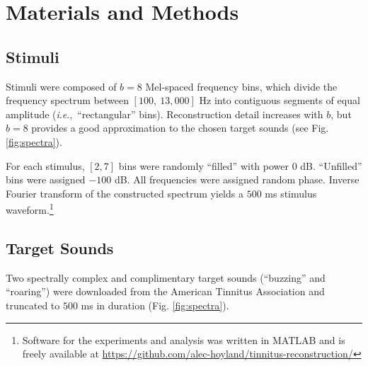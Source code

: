 \documentclass[journal]{IEEEtran}
\newcommand{\ie}{\textit{i}.\textit{e}.,\ }
\begin{document}
\section{Materials and Methods}


\subsection{Stimuli}

Stimuli were composed of $b=8$ Mel-spaced frequency bins,
which divide the frequency spectrum between $[100,~13,000]$
Hz into contiguous segments of equal amplitude (\ie ``rectangular'' bins).
Reconstruction detail increases with $b$, but $b=8$ provides a good approximation to the chosen target sounds (see Fig. \ref{fig:spectra}).

For each stimulus, $[2,7]$ bins were randomly ``filled'' with power $0$ dB. ``Unfilled'' bins were assigned $-100$ dB. All frequencies were assigned random phase.
Inverse Fourier transform of the constructed spectrum yields a $500$ ms stimulus waveform.\footnote{Software for the experiments and analysis was written in MATLAB and is freely available at \protect\url{https://github.com/alec-hoyland/tinnitus-reconstruction/}}

\subsection{Target Sounds}

Two spectrally complex and complimentary target sounds (``buzzing'' and ``roaring'') were downloaded from the American Tinnitus Association \cite{MeasuringTinnitusAmerican2022} and truncated to $500$ ms in duration (Fig. \ref{fig:spectra}).
\end{document}
